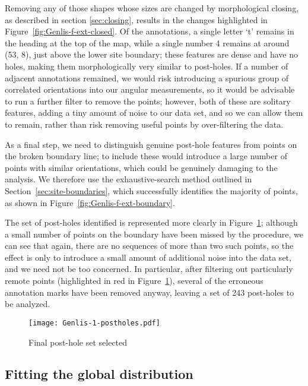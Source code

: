 \documentclass[../../ArchStats.tex]{subfiles}
\begin{document}
Removing any of those shapes whose sizes are changed by morphological closing, as described in section \ref{sec:closing}, results in the changes highlighted in Figure~\ref{fig:Genlis-f-ext-closed}. Of the annotations, a single letter `t' remains in the heading at the top of the map, while a single number 4 remains at around (53, 8), just above the lower site boundary; these features are dense and have no holes, making them morphologically very similar to post-holes. If a number of adjacent annotations remained, we would risk introducing a spurious group of correlated orientations into our angular measurements, so it would be advisable to run a further filter to remove the points; however, both of these are solitary features, adding a tiny amount of noise to our data set, and so we can allow them to remain, rather than risk removing useful points by over-filtering the data.

As a final step, we need to distinguish genuine post-hole features from points on the broken boundary line; to include these would introduce a large number of points with similar orientations, which could be genuinely damaging to the analysis. We therefore use the exhaustive-search method outlined in Section~\ref{sec:site-boundaries}, which successfully identifies the majority of points, as shown in Figure~\ref{fig:Genlis-f-ext-boundary}. 

The set of post-holes identified is represented more clearly in Figure~\ref{fig:Genlis-f-ext-postholes}; although a small number of points on the boundary have been missed by the procedure, we can see that again, there are no sequences of more than two such points, so the effect is only to introduce a small amount of additional noise into the data set, and we need not be too concerned. In particular, after filtering out particularly remote points (highlighted in red in Figure~\ref{fig:Genlis-f-ext-postholes}), several of the erroneous annotation marks have been removed anyway, leaving a set of 243 post-holes to be analyzed.

\begin{figure}[!ht]
\caption{Final post-hole set selected}
\label{fig:Genlis-f-ext-postholes}
\centering
\texttt{[image: Genlis-1-postholes.pdf]}
\end{figure}




\subsection{Fitting the global distribution}
\end{document}
